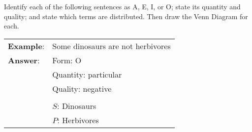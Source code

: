 
\practiceproblems

\problempart Identify each of the following sentences as A, E, I, or O; state its quantity and quality; and state which terms are distributed. Then draw the Venn Diagram for each.

\begin{longtabu}{p{.1\linewidth}p{.9\linewidth}}
\textbf{Example}: & Some dinosaurs are not herbivores \\
\textbf{Answer}: & Form: O\\
&Quantity: particular \\
&Quality: negative \\
&
\noindent {}\\
& $S$: Dinosaurs \\
& $P$: Herbivores
\end{longtabu}

